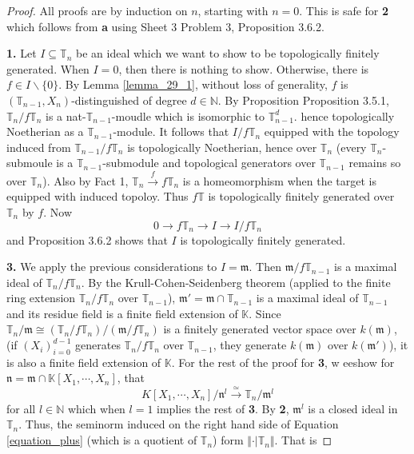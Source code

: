 \documentclass[10pt]{article}
\numberwithin{equation}{section}
\theoremstyle{definition}
\newcommand{\norm}[1]{\Vert #1 \Vert}
\newcommand{\N}[0]{\mathbb{N}}
\newcommand{\m}[0]{\mathfrak{m}}
\newcommand{\T}[0]{\mathbb{T}}
\newcommand{\K}[0]{\mathbb{K}}
\begin{document}
\begin{proof}
  All proofs are by induction on $n$, starting with $n=0$. This is safe for \textbf{2} which follows from \textbf{a} using Sheet 3 Problem 3, Proposition 3.6.2.
  \par\textbf{1.} Let $I\subseteq\T_n$ be an ideal which we want to show to be topologically finitely generated. When $I=0$, then there is nothing to show. Otherwise, there is $f\in I\backslash\{0\}$. By Lemma \ref{lemma_29_1}, without loss of generality, $f$ is $(\T_{n-1},X_n)$-distinguished of degree $d\in\N$. By Proposition Proposition 3.5.1, $\T_n/f\T_n$ is a nat-$\T_{n-1}$-moudle which is isomorphic to $\T_{n-1}^d$. 
  hence topologically Noetherian as a $\T_{n-1}$-module. It follows that $I/f\T_n$ equipped with the topology induced from $\T_{n-1}/f\T_n$ is topologically Noetherian, hence over $\T_n$ (every $\T_n$-submoule is a $\T_{n-1}$-submodule and topological generators over $\T_{n-1}$ remains so over $\T_n$). Also by Fact 1, $\T_n\stackrel{f}{\to}f\T_n$ is a homeomorphism when the target is equipped with induced topoloy. Thus $f\T$ is topologically finitely generated over $\T_n$ by $f$. Now 
  \begin{equation*}
    0\to f\T_n\to I\to I/f\T_n 
  \end{equation*}
  and Proposition 3.6.2 shows that $I$ is topologically finitely generated.
  \par\textbf{3.} We apply the previous considerations to $I=\m$. Then $\m/f\T_{n-1}$ is a maximal ideal of $\T_n/f\T_n$. By the Krull-Cohen-Seidenberg theorem (applied to the finite ring extension $\T_n/f\T_n$ over $\T_{n-1}$), $\m'=\m\cap\T_{n-1}$ is a maximal ideal of $\T_{n-1}$ and its residue field is a finite field extension of $\K$. 
  Since $\T_n/\m\cong(\T_n/f\T_n)/(\m/f\T_n)$ is a finitely generated vector space over $k(\m)$, (if $(X_i)_{i=0}^{d-1}$ generates $\T_n/f\T_n$ over $\T_{n-1}$, they generate $k(\m)$ over $k(\m')$), it is also a finite field extension of $\K$. For the rest of the proof for \textbf{3}, w eeshow for $\mathfrak{n} = \m\cap\K[X_1,\cdots,X_n]$, that 
  \begin{equation}
    \label{equation_plus}
    K[X_1,\cdots,X_n]/\mathfrak{n}^l \stackrel{\simeq}{\to}\T_n/\m^l
  \end{equation}
  for all $l\in\N$ which when $l=1$ implies the rest of \textbf{3}. By \textbf{2}, $\m^l$ is a closed ideal in $\T_n$. Thus, the seminorm induced on the right hand side of Equation \eqref{equation_plus} (which is a quotient of $\T_n$) form $\norm{\cdot\vert\T_n}$. That is 

\end{proof}
\end{document}
